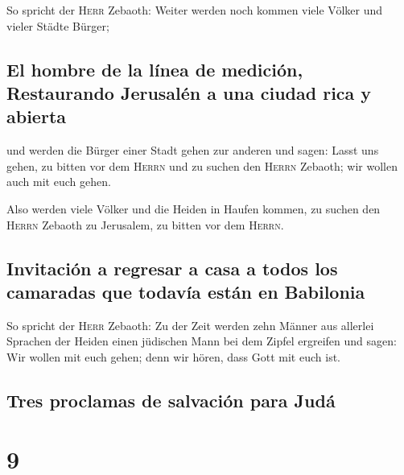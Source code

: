  So spricht der \textsc{Herr} Zebaoth: Weiter werden noch
kommen viele Völker und vieler Städte Bürger;

\hypertarget{el-hombre-de-la-luxednea-de-mediciuxf3n-restaurando-jerusaluxe9n-a-una-ciudad-rica-y-abierta}{%
\subsection{El hombre de la línea de medición, Restaurando Jerusalén a
una ciudad rica y
abierta}\label{el-hombre-de-la-luxednea-de-mediciuxf3n-restaurando-jerusaluxe9n-a-una-ciudad-rica-y-abierta}}

 und werden die Bürger einer Stadt gehen zur anderen und
sagen: Lasst uns gehen, zu bitten vor dem \textsc{Herrn} und zu suchen
den \textsc{Herrn} Zebaoth; wir wollen auch mit euch gehen.

 Also werden viele Völker und die Heiden in Haufen
kommen, zu suchen den \textsc{Herrn} Zebaoth zu Jerusalem, zu bitten vor
dem \textsc{Herrn}.

\hypertarget{invitaciuxf3n-a-regresar-a-casa-a-todos-los-camaradas-que-todavuxeda-estuxe1n-en-babilonia}{%
\subsection{Invitación a regresar a casa a todos los camaradas que
todavía están en
Babilonia}\label{invitaciuxf3n-a-regresar-a-casa-a-todos-los-camaradas-que-todavuxeda-estuxe1n-en-babilonia}}

 So spricht der \textsc{Herr} Zebaoth: Zu der Zeit werden
zehn Männer aus allerlei Sprachen der Heiden einen jüdischen Mann bei
dem Zipfel ergreifen und sagen: Wir wollen mit euch gehen; denn wir
hören, dass Gott mit euch ist.

\hypertarget{tres-proclamas-de-salvaciuxf3n-para-juduxe1}{%
\subsection{Tres proclamas de salvación para
Judá}\label{tres-proclamas-de-salvaciuxf3n-para-juduxe1}}

\hypertarget{section-8}{%
\section{9}\label{section-8}}


